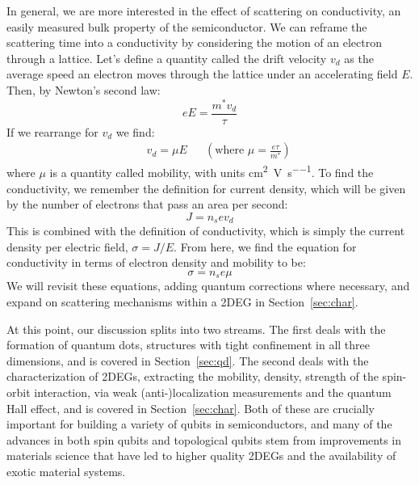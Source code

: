 In general, we are more interested in the effect of scattering on conductivity, an easily measured bulk property of
the semiconductor. We can reframe the scattering time into a conductivity by considering the motion of an electron
through a lattice. Let's define a quantity called the drift velocity $v_d$ as the average speed an electron moves through
the lattice under an accelerating field $E$. Then, by Newton's second law:
\begin{equation}
  eE = \frac{m^* v_d}{\tau}
\end{equation}
If we rearrange for $v_d$ we find:
\begin{align}
  && v_d = \mu E && \left(\textrm{where~} \mu = \frac{e \tau}{m^*}\right)
  \label{eq:driftv}
\end{align}
where $\mu$ is a quantity called mobility, with units \si{\square\centi\meter\per\volt\per\second}.
To find the conductivity, we remember the definition for current
density, which will be given by the number of electrons that pass an area per second:
\begin{equation}
  J = n_s e v_d
  \label{eq:currden}
\end{equation}
This is combined with the definition of conductivity, which is simply the current density per electric field, $\sigma = J/E$. From here,
we find the equation for conductivity in terms of electron density and mobility to be:
\begin{equation}
  \sigma = n_s e \mu
  \label{eq:cond}
\end{equation}
We will revisit these equations, adding quantum corrections where necessary, and expand on scattering mechanisms within a
2DEG in Section~\ref{sec:char}.

At this point, our discussion splits into two streams.
The first deals with the formation of quantum dots, structures with tight confinement in all three dimensions,
and is covered in Section~\ref{sec:qd}. The second deals with the characterization of 2DEGs, extracting
the mobility, density, strength of the spin-orbit interaction, via weak (anti-)localization measurements and the quantum
Hall effect, and is covered in Section~\ref{sec:char}. Both of these are crucially important for building a variety of
qubits in semiconductors, and many of the advances in both spin qubits and topological qubits stem
from improvements in materials science that have led to higher quality 2DEGs and the availability of exotic material systems.


